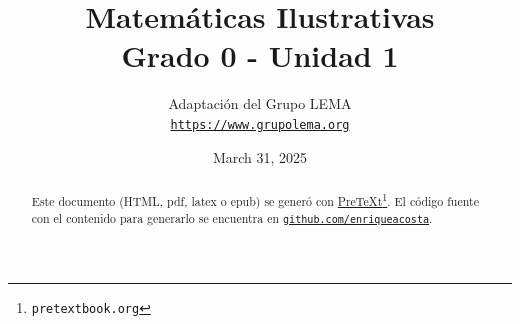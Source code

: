 
\title{Matemáticas Ilustrativas\\
{\large Grado 0 - Unidad 1}}
\author{Adaptación del Grupo LEMA\\
\href{https://www.grupolema.org}{\nolinkurl{https://www.grupolema.org}}
}
\date{March 31, 2025}

\raggedbottom
\label{gra0-uni1}\hypertarget{gra0-uni1}{}
\maketitle
\thispagestyle{empty}
\renewcommand*{\abstractname}{}
\begin{abstract}
Este documento (HTML, pdf, latex o epub) se generó con \href{https://pretextbook.org}{PreTeXt}\footnote{\nolinkurl{pretextbook.org}\label{meta-source-2-2}}. El código fuente con el contenido para generarlo se encuentra en \href{https://github.com/enriqueacosta/IllustrativeMath-GrupoLEMA}{\nolinkurl{github.com/enriqueacosta}}.%
\end{abstract}
\clearpage
\renewcommand*{\abstractname}{Licencia}
